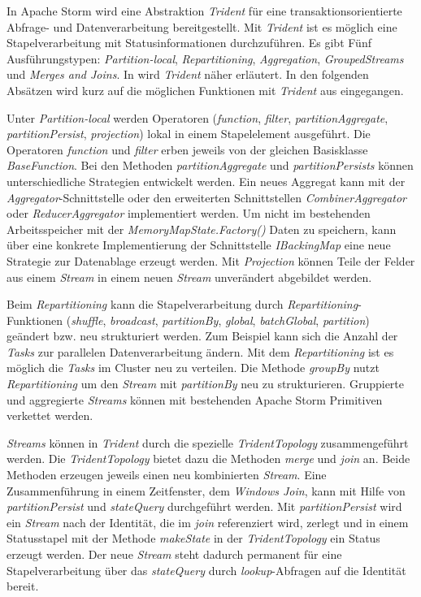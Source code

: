 In Apache Storm wird eine Abstraktion \textit{Trident} für eine transaktionsorientierte Abfrage- und Datenverarbeitung bereitgestellt. Mit \textit{Trident} ist es möglich eine Stapelverarbeitung mit Statusinformationen durchzuführen. Es gibt Fünf Ausführungstypen: \textit{Partition-local}, \textit{Repartitioning}, \textit{Aggregation}, \textit{GroupedStreams} und \textit{Merges and Joins}. In  wird \textit{Trident} näher erläutert. In den folgenden Absätzen wird kurz auf die möglichen Funktionen mit \textit{Trident} aus  eingegangen.

Unter \textit{Partition-local} werden Operatoren (\textit{function}, \textit{filter}, \textit{partitionAggregate}, \textit{partitionPersist}, \textit{projection}) lokal in einem Stapelelement ausgeführt. Die Operatoren \textit{function} und \textit{filter} erben jeweils von der gleichen Basisklasse \textit{BaseFunction}. Bei den Methoden \textit{partitionAggregate} und \textit{partitionPersists} können unterschiedliche Strategien entwickelt werden. Ein neues Aggregat kann mit der \textit{Aggregator}-Schnittstelle oder den erweiterten Schnittstellen \textit{CombinerAggregator} oder \textit{ReducerAggregator} implementiert werden. Um nicht im bestehenden Arbeitsspeicher mit der \textit{MemoryMapState.Factory()} Daten zu speichern, kann über eine konkrete Implementierung der Schnittstelle \textit{IBackingMap} eine neue Strategie zur Datenablage erzeugt werden. Mit \textit{Projection} können Teile der Felder aus einem \textit{Stream} in einem neuen \textit{Stream} unverändert abgebildet werden.

Beim \textit{Repartitioning} kann die Stapelverarbeitung durch \textit{Repartitioning}-Funktionen (\textit{shuffle}, \textit{broadcast}, \textit{partitionBy}, \textit{global}, \textit{batchGlobal}, \textit{partition}) geändert bzw. neu strukturiert werden. Zum Beispiel kann sich die Anzahl der \textit{Tasks} zur parallelen Datenverarbeitung ändern. Mit dem \textit{Repartitioning} ist es möglich die \textit{Tasks} im Cluster neu zu verteilen. Die Methode \textit{groupBy} nutzt \textit{Repartitioning} um den \textit{Stream} mit \textit{partitionBy} neu zu strukturieren. Gruppierte und aggregierte \textit{Streams} können mit bestehenden Apache Storm Primitiven verkettet werden.

\textit{Streams} können in \textit{Trident} durch die spezielle \textit{TridentTopology} zusammengeführt werden. Die \textit{TridentTopology} bietet dazu die Methoden \textit{merge} und \textit{join} an. Beide Methoden erzeugen jeweils einen neu kombinierten \textit{Stream}. Eine Zusammenführung in einem Zeitfenster, dem \textit{Windows Join}, kann mit Hilfe von \textit{partitionPersist} und \textit{stateQuery} durchgeführt werden. Mit \textit{partitionPersist} wird ein \textit{Stream} nach der Identität, die im \textit{join} referenziert wird, zerlegt und in einem Statusstapel mit der Methode \textit{makeState} in der \textit{TridentTopology} ein Status erzeugt werden. Der neue \textit{Stream} steht dadurch permanent für eine Stapelverarbeitung über das \textit{stateQuery} durch \textit{lookup}-Abfragen auf die Identität bereit. 

